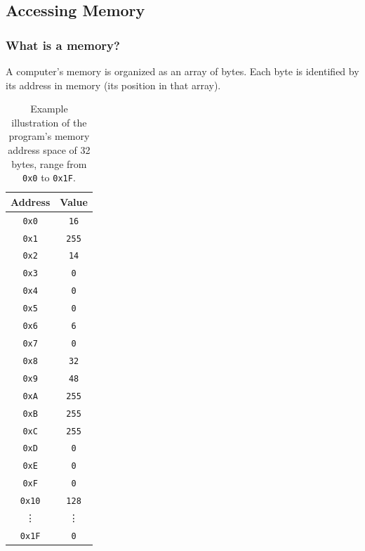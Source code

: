 \subsection{Accessing Memory}

\subsubsection{What is a memory?}

A computer's memory is organized as an array of bytes. Each byte is identified by its address in memory (its position in that array).
\begin{table}[!htp]
    \centering
    \begin{tabular}{@{} c | c @{}}
        \toprule
        Address & Value \\
        \midrule
        \texttt{0x0} & \texttt{16} \\
        \texttt{0x1} & \texttt{255} \\
        \texttt{0x2} & \texttt{14} \\
        \texttt{0x3} & \texttt{0} \\
        \texttt{0x4} & \texttt{0} \\
        \texttt{0x5} & \texttt{0} \\
        \texttt{0x6} & \texttt{6} \\
        \texttt{0x7} & \texttt{0} \\
        \texttt{0x8} & \texttt{32} \\
        \texttt{0x9} & \texttt{48} \\
        \texttt{0xA} & \texttt{255} \\
        \texttt{0xB} & \texttt{255} \\
        \texttt{0xC} & \texttt{255} \\
        \texttt{0xD} & \texttt{0} \\
        \texttt{0xE} & \texttt{0} \\
        \texttt{0xF} & \texttt{0} \\
        \texttt{0x10} & \texttt{128} \\
        \vdots & \vdots \\
        \texttt{0x1F} & \texttt{0} \\
        \bottomrule
    \end{tabular}
    \caption{Example illustration of the program's memory address space of 32 bytes, range from \texttt{0x0} to \texttt{0x1F}.}
\end{table}

